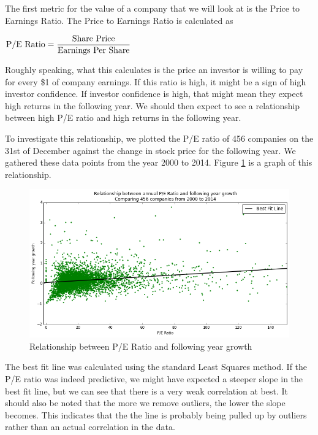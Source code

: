 \documentclass{report}
\begin{document}
The first metric for the value of a company that we will look at is the Price to Earnings Ratio. The Price to Earnings Ratio is calculated as

\begin{math}
  \\
	\text{P/E Ratio} = \dfrac{\text{Share Price}}{\text{Earnings Per Share}}
	\\
\end{math}

Roughly speaking, what this calculates is the price an investor is willing to pay for every \$1 of company earnings. If this ratio is high, it might be a sign of high investor confidence. If investor confidence is high, that might mean they expect high returns in the following year. We should then expect to see a relationship between high P/E ratio and high returns in the following year.

To investigate this relationship, we plotted the P/E ratio of 456 companies on the 31st of December against the change in stock price for the following year. We gathered these data points from the year 2000 to 2014. Figure \ref{fig:pe-abs} is a graph of this relationship.

\begin{figure}[H]
	\caption{Relationship between P/E Ratio and following year growth}
	\centerline{\includegraphics[width=\textwidth]{vis/pe-ratio-abs.png}}
	\label{fig:pe-abs}
\end{figure}

The best fit line was calculated using the standard Least Squares method. If the P/E ratio was indeed predictive, we might have expected a steeper slope in the best fit line, but we can see that there is a very weak correlation at best. It should also be noted that the more we remove outliers, the lower the slope becomes. This indicates that the the line is probably being pulled up by outliers rather than an actual correlation in the data. 
\end{document}
